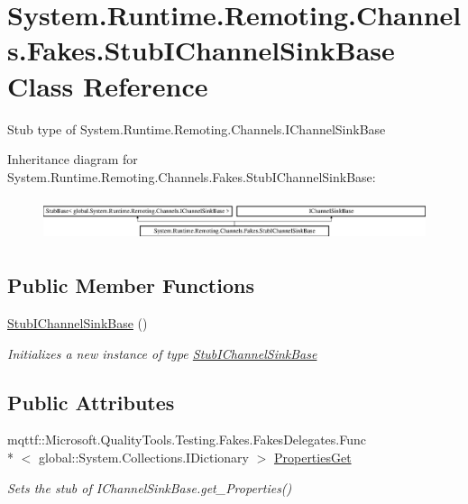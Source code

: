 \hypertarget{class_system_1_1_runtime_1_1_remoting_1_1_channels_1_1_fakes_1_1_stub_i_channel_sink_base}{\section{System.\-Runtime.\-Remoting.\-Channels.\-Fakes.\-Stub\-I\-Channel\-Sink\-Base Class Reference}
\label{class_system_1_1_runtime_1_1_remoting_1_1_channels_1_1_fakes_1_1_stub_i_channel_sink_base}
}


Stub type of System.\-Runtime.\-Remoting.\-Channels.\-I\-Channel\-Sink\-Base 


Inheritance diagram for System.\-Runtime.\-Remoting.\-Channels.\-Fakes.\-Stub\-I\-Channel\-Sink\-Base\-:\begin{figure}[H]
\begin{center}
\leavevmode
\includegraphics[height=1.269841cm]{class_system_1_1_runtime_1_1_remoting_1_1_channels_1_1_fakes_1_1_stub_i_channel_sink_base}
\end{center}
\end{figure}
\subsection*{Public Member Functions}
\begin{DoxyCompactItemize}
\item 
\hyperlink{class_system_1_1_runtime_1_1_remoting_1_1_channels_1_1_fakes_1_1_stub_i_channel_sink_base_aebe7b1e12acc8fefd8c5bff69bccde0b}{Stub\-I\-Channel\-Sink\-Base} ()
\begin{DoxyCompactList}\small\item\em Initializes a new instance of type \hyperlink{class_system_1_1_runtime_1_1_remoting_1_1_channels_1_1_fakes_1_1_stub_i_channel_sink_base}{Stub\-I\-Channel\-Sink\-Base}\end{DoxyCompactList}\end{DoxyCompactItemize}
\subsection*{Public Attributes}
\begin{DoxyCompactItemize}
\item 
mqttf\-::\-Microsoft.\-Quality\-Tools.\-Testing.\-Fakes.\-Fakes\-Delegates.\-Func\\*
$<$ global\-::\-System.\-Collections.\-I\-Dictionary $>$ \hyperlink{class_system_1_1_runtime_1_1_remoting_1_1_channels_1_1_fakes_1_1_stub_i_channel_sink_base_af41481955986aa1df6b6e90e635f0d3b}{Properties\-Get}
\begin{DoxyCompactList}\small\item\em Sets the stub of I\-Channel\-Sink\-Base.\-get\-\_\-\-Properties()\end{DoxyCompactList}\end{DoxyCompactItemize}


